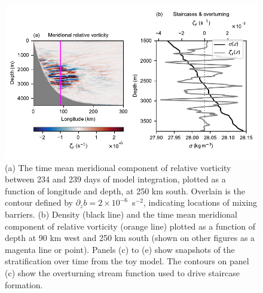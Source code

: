\begin{figure}[p]
    \centering
    \includegraphics{../figures/Figure3.pdf}
    \caption{(a) The time mean meridional component of relative vorticity between 234 and 239 days of model integration, plotted as a function of longitude and depth, at 250 km south. Overlain is the contour defined by $\partial_z b = 2 \times 10^{-6}$~s$^{-2}$, indicating locations of mixing barriers. (b) Density (black line) and the time mean meridional component of relative vorticity (orange line) plotted as a function of depth at 90 km west and 250 km south (shown on other figures as a magenta line or point). Panels (c) to (e) show snapshots of the stratification over time from the toy model. The contours on panel (c) show the overturning stream function used to drive staircase formation.}
    \label{fig:StaircaseMechanism}
\end{figure}

